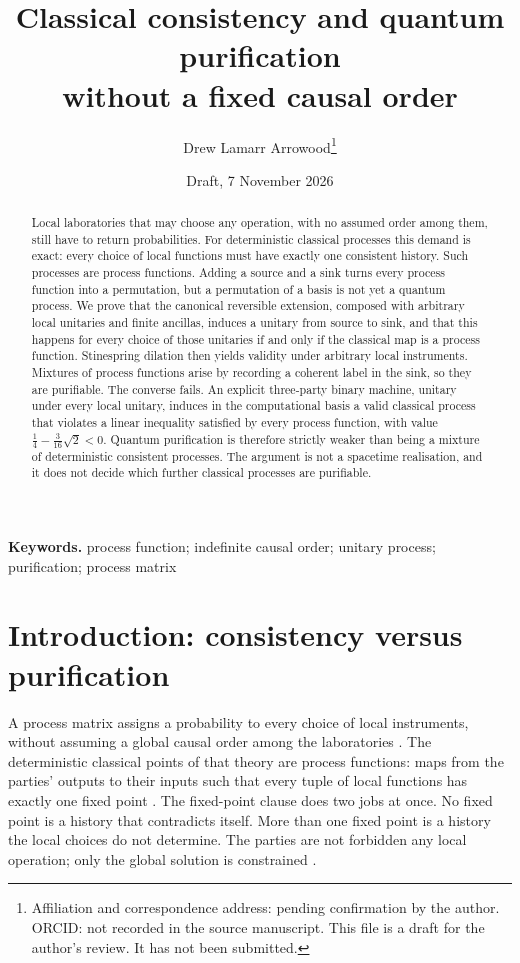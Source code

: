 \documentclass[11pt]{article}
\title{Classical consistency and quantum purification\\ without a fixed causal order}
\author{Drew Lamarr Arrowood\thanks{Affiliation and correspondence address: pending confirmation by the author. ORCID: not recorded in the source manuscript. This file is a draft for the author's review. It has not been submitted.}}
\date{Draft, 7 November 2026}
\theoremstyle{definition}
\theoremstyle{remark}
\begin{document}
\maketitle

\begin{abstract}
Local laboratories that may choose any operation, with no assumed order among them, still have to return probabilities. For deterministic classical processes this demand is exact: every choice of local functions must have exactly one consistent history. Such processes are process functions. Adding a source and a sink turns every process function into a permutation, but a permutation of a basis is not yet a quantum process. We prove that the canonical reversible extension, composed with arbitrary local unitaries and finite ancillas, induces a unitary from source to sink, and that this happens for every choice of those unitaries if and only if the classical map is a process function. Stinespring dilation then yields validity under arbitrary local instruments. Mixtures of process functions arise by recording a coherent label in the sink, so they are purifiable. The converse fails. An explicit three-party binary machine, unitary under every local unitary, induces in the computational basis a valid classical process that violates a linear inequality satisfied by every process function, with value \(\tfrac14-\tfrac{3}{16}\sqrt{2}<0\). Quantum purification is therefore strictly weaker than being a mixture of deterministic consistent processes. The argument is not a spacetime realisation, and it does not decide which further classical processes are purifiable.
\end{abstract}

\noindent\textbf{Keywords.} process function; indefinite causal order; unitary process; purification; process matrix

\section{Introduction: consistency versus purification}
\label{sec:intro}

A process matrix assigns a probability to every choice of local instruments, without assuming a global causal order among the laboratories \cite{oreshkov2012,araujo2017}. The deterministic classical points of that theory are process functions: maps from the parties' outputs to their inputs such that every tuple of local functions has exactly one fixed point \cite{baumeler2016,baumeler2019}. The fixed-point clause does two jobs at once. No fixed point is a history that contradicts itself. More than one fixed point is a history the local choices do not determine. The parties are not forbidden any local operation; only the global solution is constrained \cite{baumeler2019}.
\end{document}
